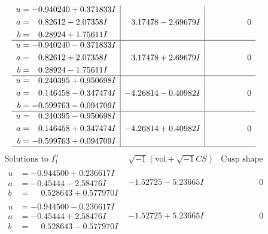 \documentclass[1p]{elsarticle_modified}
\theoremstyle{definition}
\newcommand{\I}{\sqrt{-1}}
\begin{document}
$$\begin{array}{c|c|c}
\begin{aligned}
u &= -0.940240 + 0.371833 I \\
a &= \phantom{-}0.82612 - 2.07358 I \\
b &= \phantom{-}0.28924 + 1.75611 I\end{aligned}
 & \phantom{-}3.17478 - 2.69679 I & \phantom{-0.000000 } 0 \\ \hline\begin{aligned}
u &= -0.940240 - 0.371833 I \\
a &= \phantom{-}0.82612 + 2.07358 I \\
b &= \phantom{-}0.28924 - 1.75611 I\end{aligned}
 & \phantom{-}3.17478 + 2.69679 I & \phantom{-0.000000 } 0 \\ \hline\begin{aligned}
u &= \phantom{-}0.240395 + 0.950698 I \\
a &= \phantom{-}0.146458 - 0.347474 I \\
b &= -0.599763 - 0.094709 I\end{aligned}
 & -4.26814 - 0.40982 I & \phantom{-0.000000 } 0 \\ \hline\begin{aligned}
u &= \phantom{-}0.240395 - 0.950698 I \\
a &= \phantom{-}0.146458 + 0.347474 I \\
b &= -0.599763 + 0.094709 I\end{aligned}
 & -4.26814 + 0.40982 I & \phantom{-0.000000 } 0\\
 \hline 
 \end{array}$$\newpage$$\begin{array}{c|c|c}  
\text{Solutions to }I^u_{1}& \I (\text{vol} + \sqrt{-1}CS) & \text{Cusp shape}\\
 \hline 
\begin{aligned}
u &= -0.944500 + 0.236617 I \\
a &= -0.45444 - 2.58476 I \\
b &= \phantom{-}0.528643 + 0.577970 I\end{aligned}
 & -1.52725 - 5.23665 I & \phantom{-0.000000 } 0 \\ \hline\begin{aligned}
u &= -0.944500 - 0.236617 I \\
a &= -0.45444 + 2.58476 I \\
b &= \phantom{-}0.528643 - 0.577970 I\end{aligned}
 & -1.52725 + 5.23665 I & \phantom{-0.000000 } 0 \\ \hline\begin{aligned}

\end{aligned}
\end{array}$$
\end{document}
